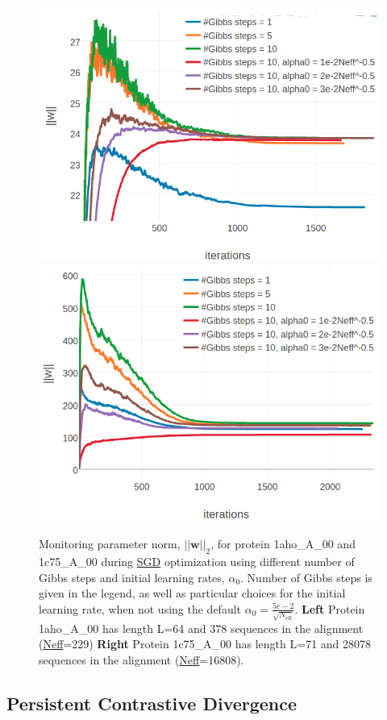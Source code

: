\documentclass[11pt,a4paper,twoside]{book}
\newcommand{\w}{\mathbf{w}}
\theoremstyle{definition}
\theoremstyle{definition}
\theoremstyle{remark}
\begin{document}
\begin{figure}

{\centering \includegraphics[width=0.48\linewidth]{img/full_likelihood/gibbs_sampling/parameter_norm_1ahoa00} \includegraphics[width=0.48\linewidth]{img/full_likelihood/gibbs_sampling/parameter_norm_1c75a00} 

}

\caption{Monitoring parameter norm,
\(||\w||_2\), for protein 1aho\_A\_00 and 1c75\_A\_00 during
\protect\hyperlink{abbrev}{SGD} optimization using different number of
Gibbs steps and initial learning rates, \(\alpha_0\). Number of Gibbs
steps is given in the legend, as well as particular choices for the
initial learning rate, when not using the default
\(\alpha_0 = \frac{5e-2}{\sqrt{N_{\text{eff}}}}\). \textbf{Left} Protein
1aho\_A\_00 has length L=64 and 378 sequences in the alignment
(\protect\hyperlink{abbrev}{Neff}=229) \textbf{Right} Protein
1c75\_A\_00 has length L=71 and 28078 sequences in the alignment
(\protect\hyperlink{abbrev}{Neff}=16808).}\label{fig:cd-gibbssteps-single-proteins}
\end{figure}

\subsection{Persistent Contrastive Divergence}\label{cd-gibbs-steps}
\end{document}
